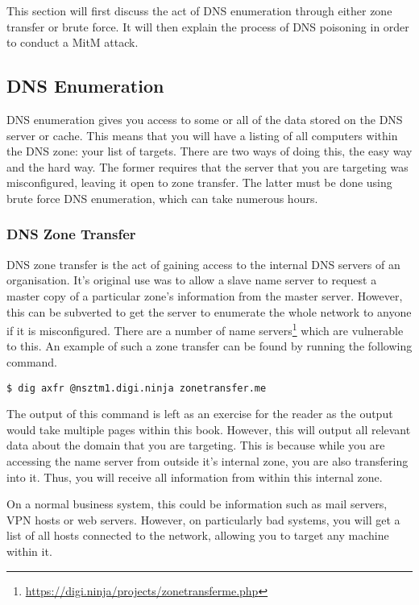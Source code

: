 		This section will first discuss the act of DNS enumeration through either zone transfer or brute force. 
		It will then explain the process of DNS poisoning in order to conduct a MitM attack. 

		\subsection{DNS Enumeration}
			DNS enumeration gives you access to some or all of the data stored on the DNS server or cache. 
			This means that you will have a listing of all computers within the DNS zone: your list of targets. 
			There are two ways of doing this, the easy way and the hard way. 
			The former requires that the server that you are targeting was misconfigured, leaving it open to zone transfer. 
			The latter must be done using brute force DNS enumeration, which can take numerous hours. 

			\subsubsection{DNS Zone Transfer}
				DNS zone transfer is the act of gaining access to the internal DNS servers of an organisation. 
				It's original use was to allow a slave name server to request a master copy of a particular zone's information from the master server. 
				However, this can be subverted to get the server to enumerate the whole network to anyone if it is misconfigured. 
				There are a number of name servers\footnote{\url{https://digi.ninja/projects/zonetransferme.php}} which are vulnerable to this. 
				An example of such a zone transfer can be found by running the following command. 
				\begin{lstlisting}[style=CLI]
					$ dig axfr @nsztm1.digi.ninja zonetransfer.me
				\end{lstlisting}
				The output of this command is left as an exercise for the reader as the output would take multiple pages within this book. 
				However, this will output all relevant data about the domain that you are targeting. 
				This is because while you are accessing the name server from outside it's internal zone, you are also transfering into it. 
				Thus, you will receive all information from within this internal zone. 

				On a normal business system, this could be information such as mail servers, VPN hosts or web servers. 
				However, on particularly bad systems, you will get a list of all hosts connected to the network, allowing you to target any machine within it. 

